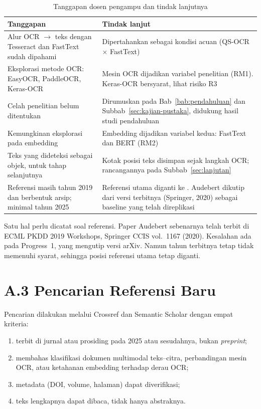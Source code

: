 \begin{table}[H]
  \centering
  \caption{Tanggapan dosen pengampu dan tindak lanjutnya}
  \label{tab:tanggapan}
  \fontsize{10}{12}\selectfont
  \begin{tabularx}{\textwidth}{|>{\raggedright\arraybackslash}p{5.4cm}|>{\raggedright\arraybackslash}X|}
    \hline
    \textbf{Tanggapan} & \textbf{Tindak lanjut} \\ \hline
    Alur OCR $\rightarrow$ teks dengan Tesseract dan FastText sudah dipahami &
    Dipertahankan sebagai kondisi acuan (QS-OCR $\times$ FastText) \\ \hline
    Eksplorasi metode OCR: EasyOCR, PaddleOCR, Keras-OCR &
    Mesin OCR dijadikan variabel penelitian (RM1). Keras-OCR bersyarat, lihat risiko
    R3 \\ \hline
    Celah penelitian belum ditentukan &
    Dirumuskan pada Bab~\ref{bab:pendahuluan} dan Subbab~\ref{sec:kajian-pustaka}, didukung
    hasil studi pendahuluan \\ \hline
    Kemungkinan eksplorasi pada embedding &
    Embedding dijadikan variabel kedua: FastText dan BERT (RM2) \\ \hline
    Teks yang dideteksi sebagai objek, untuk tahap selanjutnya &
    Kotak posisi teks disimpan sejak langkah OCR; rancangannya pada
    Subbab~\ref{sec:lanjutan} \\ \hline
    Referensi masih tahun 2019 dan berbentuk arsip; minimal tahun 2025 &
    Referensi utama diganti ke \textcite{kashyap2026}. Audebert dikutip dari versi
    terbitnya (Springer, 2020) sebagai baseline yang telah direplikasi \\ \hline
  \end{tabularx}
\end{table}

Satu hal perlu dicatat soal referensi. Paper Audebert sebenarnya telah terbit di ECML
PKDD 2019 Workshops, Springer CCIS vol.~1167 (2020). Kesalahan ada pada Progress~1, yang
mengutip versi arXiv. Namun tahun terbitnya tetap tidak memenuhi syarat, sehingga posisi
referensi utama tetap diganti.

\section*{A.3 Pencarian Referensi Baru}

Pencarian dilakukan melalui Crossref dan Semantic Scholar dengan empat kriteria:
\begin{enumerate}
  \item terbit di jurnal atau prosiding pada 2025 atau sesudahnya, bukan
  \textit{preprint};
  \item membahas klasifikasi dokumen multimodal teks--citra, perbandingan mesin OCR, atau
  ketahanan embedding terhadap derau OCR;
  \item metadata (DOI, volume, halaman) dapat diverifikasi;
  \item teks lengkapnya dapat dibaca, tidak hanya abstraknya.
\end{enumerate}

